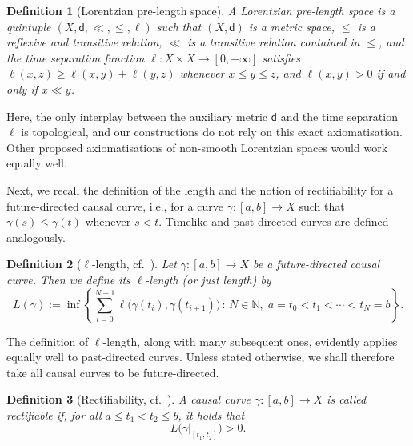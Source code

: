 \documentclass[hidelinks,12pt,a4paper]{article}
\numberwithin{equation}{section}
\theoremstyle{plain}
\newtheorem{definition}{Definition}[section]
\theoremstyle{definition}
\newcommand{\LpLSn}{Lo\-rentz\-ian pre-length space}
\begin{document}
\begin{definition}[\LpLSn]
\label{def: LpLS}
A \emph{Lorentzian pre-length space} is a quintuple $(X,\mathsf d,\ll,\leq,\ell)$ such that $(X,\mathsf d)$ is a metric space, $\leq$ is a reflexive and transitive relation, $\ll$ is a transitive relation contained in $\leq$, and the time separation function $\ell\colon X\times X\to[0,+\infty]$ satisfies $\ell(x,z)\geq \ell(x,y)+\ell(y,z)$ whenever $x\leq y\leq z$, and $\ell(x,y)>0$ if and only if $x\ll y$.
\end{definition}

Here, the only interplay between the auxiliary metric $\mathsf d$ and the time separation $\ell$ is topological, and our constructions do not rely on this exact axiomatisation. Other proposed axiomatisations of non-smooth Lorentzian spaces would work equally well.

Next, we recall the definition of the length and the notion of rectifiability for a future-directed causal curve, i.e., for a curve $\gamma\colon [a,b] \to X$ such that $\gamma(s) \leq \gamma(t)$ whenever $s < t$. Timelike and past-directed curves are defined analogously.
\begin{definition}[{$\ell$-length, cf.~\cite[Definition~2.24]{KS18}}]\label{length}
Let $\gamma \colon [a,b] \to X$ be a future-directed causal curve. Then we define its \emph{$\ell$-length} (or just \emph{length}) by
\begin{equation}\label{definition of length}
L(\gamma)
:= \inf \left\{
\sum_{i=0}^{N-1} \ell\bigl(\gamma(t_i),\gamma(t_{i+1})\bigr)
\,:\,
N \in \mathbb{N},\;
a=t_0<t_1<\cdots<t_N=b
\right\}.
\end{equation}
\end{definition}

The definition of $\ell$-length, along with many subsequent ones, evidently applies equally well to past-directed curves. 
Unless stated otherwise, we shall therefore take all causal curves to be future-directed.

\begin{definition}[{Rectifiability, cf.~\cite[Definition~2.29]{KS18}}]
\label{rectifiable of causal curve}
A causal curve $\gamma\colon [a,b]\to X$ is called \emph{rectifiable} if, for all $a\le t_1<t_2\le b$, it holds that
\begin{equation*}
L\bigl(\gamma|_{[t_1,t_2]}\bigr)>0. 
\end{equation*}
\end{definition}
\end{document}
